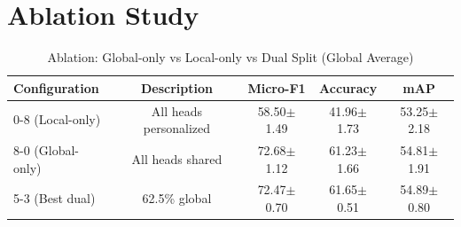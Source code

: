 \documentclass[11pt]{article}
\begin{document}
\section{Ablation Study}

\begin{table}[h!]
\centering
\caption{Ablation: Global-only vs Local-only vs Dual Split (Global Average)}
\label{tab:ablation}
\small
\begin{tabular}{@{}lcccc@{}}
\toprule
\textbf{Configuration} & \textbf{Description} & \textbf{Micro-F1} & \textbf{Accuracy} & \textbf{mAP} \\
\midrule
0-8 (Local-only) & All heads personalized & 58.50$\pm$1.49 & 41.96$\pm$1.73 & 53.25$\pm$2.18 \\
8-0 (Global-only) & All heads shared & 72.68$\pm$1.12 & 61.23$\pm$1.66 & 54.81$\pm$1.91 \\
5-3 (Best dual) & 62.5\% global & 72.47$\pm$0.70 & 61.65$\pm$0.51 & 54.89$\pm$0.80 \\
\bottomrule
\end{tabular}
\end{table}
\end{document}
